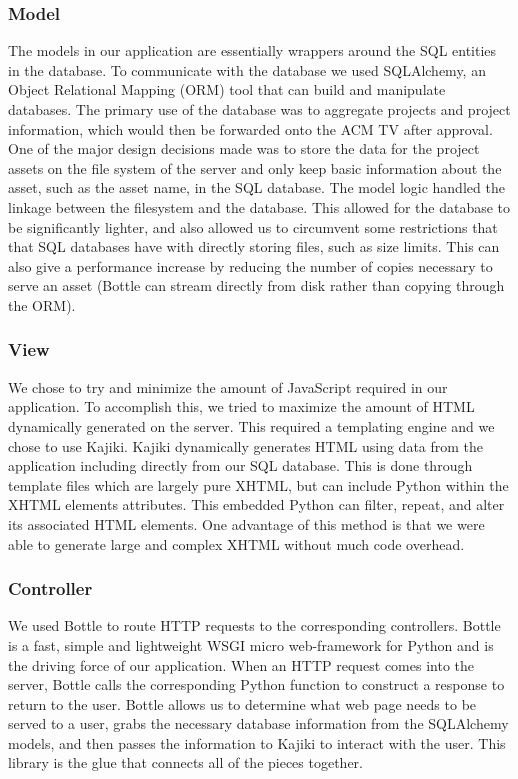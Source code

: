 \documentclass[12pt]{article}
\begin{document}
\subsubsection{Model}
The models in our application are essentially wrappers around the SQL entities
in the database. To communicate with the database we used SQLAlchemy, an Object
Relational Mapping (ORM) tool that can build and manipulate databases. The
primary use of the database was to aggregate projects and project information,
which would then be forwarded onto the ACM TV after approval. One of the major
design decisions made was to store the data for the project assets on the file
system of the server and only keep basic information about the asset, such as
the asset name, in the SQL database. The model logic handled the linkage between
the filesystem and the database. This allowed for the database to be
significantly lighter, and also allowed us to circumvent some restrictions that
that SQL databases have with directly storing files, such as size limits. This
can also give a performance increase by reducing the number of copies necessary
to serve an asset (Bottle can stream directly from disk rather than copying
through the ORM).

\subsubsection{View}
We chose to try and minimize the amount of JavaScript required in our
application. To accomplish this, we tried to maximize the amount of HTML
dynamically generated on the server. This required a templating engine and we
chose to use Kajiki. Kajiki dynamically generates HTML using data from the
application including directly from our SQL database. This is done through
template files which are largely pure XHTML, but can include Python within the
XHTML elements attributes. This embedded Python can filter, repeat, and alter
its associated HTML elements. One advantage of this method is that we were able
to generate large and complex XHTML without much code overhead.

\subsubsection{Controller}
We used Bottle to route HTTP requests to the corresponding controllers. Bottle
is a fast, simple and lightweight WSGI micro web-framework for Python and is the
driving force of our application. When an HTTP request comes into the server,
Bottle calls the corresponding Python function to construct a response to return
to the user. Bottle allows us to determine what web page needs to be served to a
user, grabs the necessary database information from the SQLAlchemy models, and
then passes the information to Kajiki to interact with the user. This library is
the glue that connects all of the pieces together.
\end{document}
